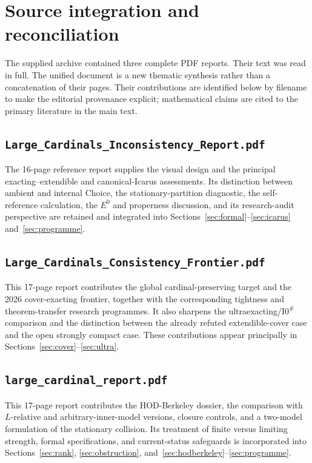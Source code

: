 \documentclass[11pt,letterpaper]{article}
\theoremstyle{definition}
\newcommand{\Isharp}{\mathrm{I0}^{\#}}
\begin{document}
\clearpage
\appendix
\section{Source integration and reconciliation}\label{app:integration}

The supplied archive contained three complete PDF reports. Their text was read in full. The unified document is a new thematic synthesis rather than a concatenation of their pages. Their contributions are identified below by filename to make the editorial provenance explicit; mathematical claims are cited to the primary literature in the main text.

\subsection*{\nolinkurl{Large_Cardinals_Inconsistency_Report.pdf}}
The 16-page reference report supplies the visual design and the principal exacting--extendible and canonical-Icarus assessments. Its distinction between ambient and internal Choice, the stationary-partition diagnostic, the self-reference calculation, the $E^0$ and properness discussion, and its research-audit perspective are retained and integrated into Sections~\ref{sec:formal}--\ref{sec:icarus} and~\ref{sec:programme}.

\subsection*{\nolinkurl{Large_Cardinals_Consistency_Frontier.pdf}}
This 17-page report contributes the global cardinal-preserving target and the 2026 cover-exacting frontier, together with the corresponding tightness and theorem-transfer research programmes. It also sharpens the ultraexacting/$\Isharp$ comparison and the distinction between the already refuted extendible-cover case and the open strongly compact case. These contributions appear principally in Sections~\ref{sec:cover}--\ref{sec:ultra}.

\subsection*{\nolinkurl{large_cardinal_report.pdf}}
This 17-page report contributes the HOD-Berkeley dossier, the comparison with $L$-relative and arbitrary-inner-model versions, closure controls, and a two-model formulation of the stationary collision. Its treatment of finite versus limiting strength, formal specifications, and current-status safeguards is incorporated into Sections~\ref{sec:rank}, \ref{sec:obstruction}, and~\ref{sec:hodberkeley}--\ref{sec:programme}.
\end{document}
